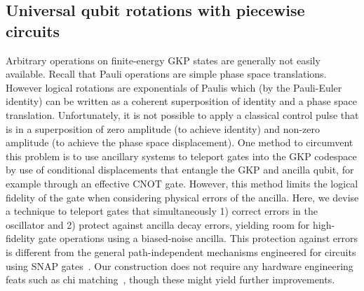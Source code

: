 \documentclass[aps,prx,showpacs,notitlepage,twocolumn,superscriptaddress,nofootinbib,preprintnumbers,floatfix,10pt, longbibliography]{revtex4-2}
\begin{document}
\subsection{Universal qubit rotations with piecewise circuits}\label{ssec:piecewise-teleportation}
Arbitrary operations on finite-energy GKP states are generally not easily available. Recall that Pauli operations are simple phase space translations. However logical rotations are exponentials of Paulis which (by the Pauli-Euler identity) can be written as a coherent superposition of identity and a phase space translation. Unfortunately, it is not possible to apply a classical control pulse that is in a superposition of zero amplitude (to achieve identity) and non-zero amplitude (to achieve the phase space displacement). One method to circumvent this problem is to use ancillary systems to teleport gates into the GKP codespace by use of conditional displacements that entangle the GKP and ancilla qubit, for example through an effective CNOT gate. However, this method limits the logical fidelity of the gate when considering physical errors of the ancilla. Here, we devise a technique to teleport gates that simultaneously 1) correct errors in the oscillator and 2) protect against ancilla decay errors, yielding room for high-fidelity gate operations using a biased-noise ancilla. This protection against errors is different from the general path-independent mechanisms engineered for circuits using SNAP gates~\cite{ma2020path,ma2022algebraic,ReinholdErrorCorrectedGates}. Our construction does not require any hardware engineering feats such as chi matching~\cite{ReinholdErrorCorrectedGates,xu2024fault}, though these might yield further improvements. 
\end{document}
